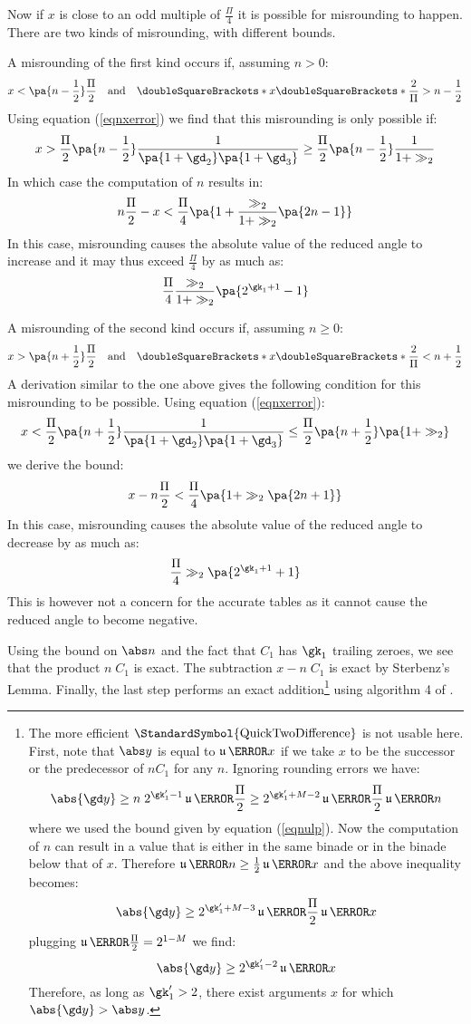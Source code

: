\documentclass[10pt, a4paper, twoside]{basestyle}
\DeclareMathOperator{\ULP}{\mathfrak u}
\DeclareMathOperator{\quicktwodifference}{\StandardSymbol{QuickTwoDifference}}
\newcommand{\round}[1]{\doubleSquareBrackets*{#1}}
\begin{document}
Now if $x$ is close to an odd multiple of $\frac{\Pi}{4}$ it is possible for misrounding to happen.   There are two kinds of misrounding, with different bounds.

A misrounding of the first kind occurs if, assuming $n > 0$:
\[
x < \pa{n - \frac{1}{2}}\frac{\Pi}{2} \quad \text{and} \quad \round{x \round{\frac{2}{\Pi}}} > n - \frac{1}{2}
\]
Using equation (\ref{eqnxerror}) we find that this misrounding is only possible if:
\[
x > \frac{\Pi}{2} \pa{n - \frac{1}{2}} \frac{1}{\pa{1 + \gd_2} \pa{1 + \gd_3}} \geq \frac{\Pi}{2} \pa{n - \frac{1}{2}} \frac{1}{1 + \gg_2}
\]
In which case the computation of $n$ results in:
\[
n \frac{\Pi}{2} - x < \frac{\Pi}{4} \pa{1 + \frac{\gg_2}{1 + \gg_2} \pa{2 n - 1}}
\]
In this case, misrounding causes the absolute value of the reduced angle to increase and it may thus exceed $\frac{\Pi}{4}$ by as much as:
\[
\frac{\Pi}{4} \frac{\gg_2}{1 + \gg_2} \pa{2^{\gk_1 + 1} - 1}
\]

A misrounding of the second kind occurs if, assuming $n \geq 0$:
\[
x > \pa{n + \frac{1}{2}}\frac{\Pi}{2} \quad \text{and} \quad \round{x \round{\frac{2}{\Pi}}} < n + \frac{1}{2}
\]
A derivation similar to the one above gives the following condition for this misrounding to be possible.  Using equation (\ref{eqnxerror}):
\[
x < \frac{\Pi}{2} \pa{n + \frac{1}{2}} \frac{1}{\pa{1 + \gd_2} \pa{1 + \gd_3}} \leq \frac{\Pi}{2} \pa{n + \frac{1}{2}} \pa{1 + \gg_2}
\]
we derive the bound:
\[
x - n \frac{\Pi}{2} < \frac{\Pi}{4} \pa{1 + \gg_2 \pa{2 n + 1}}
\]
In this case, misrounding causes the absolute value of the reduced angle to decrease by as much as:
\begin{equation}
\frac{\Pi}{4} \gg_2 \pa{2^{\gk_1 + 1} + 1}
\label{eqnmisroundingbound}
\end{equation}
This is however not a concern for the accurate tables as it cannot cause the reduced angle to become negative.

Using the bound on $\abs n$ and the fact that $C_1$ has $\gk_1$ trailing zeroes, we see that the product $n \; C_1$ is exact.  The subtraction $x - n \; C_1$ is exact by Sterbenz's Lemma.  Finally, the last step performs an exact addition\footnote{The more efficient $\quicktwodifference$ is not usable here.  First, note that $\abs y$ is equal to $\ULP\of{x}$ if we take $x$ to be the successor or the predecessor of $n C_1$ for any $n$. Ignoring rounding errors we have:
\[ 
\abs{\gd y} \geq n \; 2^{\gk'_1 - 1} \ULP\of{\frac{\Pi}{2}} \geq 2^{\gk'_1 + M - 2} \ULP\of{\frac{\Pi}{2}} \ULP\of{n}
\]
where we used the bound given by equation (\ref{eqnulp}).  Now the computation of $n$ can result in a value that is either in the same binade or in the binade below that of $x$.  Therefore $\ULP\of{n} \geq \frac{1}{2} \ULP\of{x}$ and the above inequality becomes:
\[
\abs{\gd y} \geq 2^{\gk'_1 + M - 3} \ULP\of{\frac{\Pi}{2}} \ULP\of{x}
\]
plugging $\ULP\of{\frac{\Pi}{2}} = 2^{1 - M}$ we find:
\[
\abs{\gd y} \geq 2^{\gk'_1 - 2} \ULP\of{x}
\]
Therefore, as long as $\gk'_1 > 2$, there exist arguments $x$ for which $\abs{\gd y} > \abs y$.
} using algorithm 4 of \cite{HidaLiBailey2007}.
\end{document}
